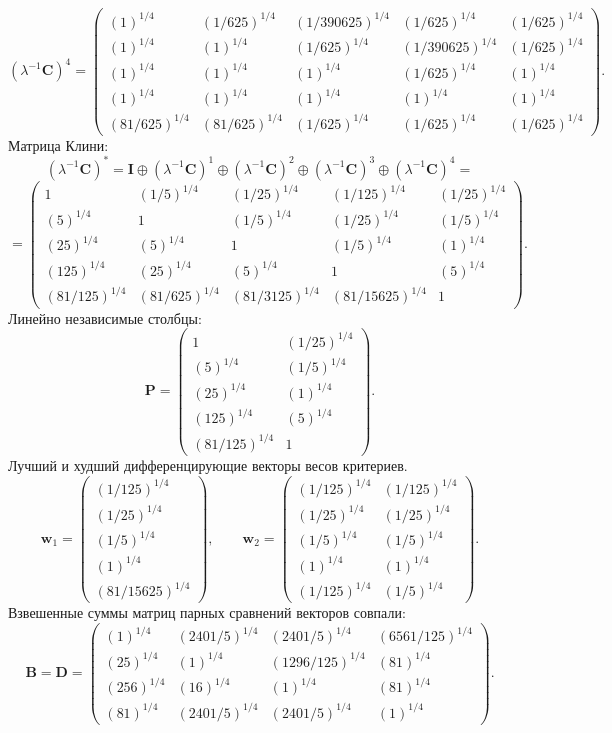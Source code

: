 $$(\lambda^{-1}\bm{C})^4 = \begin{pmatrix}
(1)^{1/4} & (1/625)^{1/4} & (1/390625)^{1/4} & (1/625)^{1/4} & (1/625)^{1/4}\\
(1)^{1/4} & (1)^{1/4} & (1/625)^{1/4} & (1/390625)^{1/4} & (1/625)^{1/4}\\
(1)^{1/4} & (1)^{1/4} & (1)^{1/4} & (1/625)^{1/4} & (1)^{1/4}\\
(1)^{1/4} & (1)^{1/4} & (1)^{1/4} & (1)^{1/4} & (1)^{1/4}\\
(81/625)^{1/4} & (81/625)^{1/4} & (1/625)^{1/4} & (1/625)^{1/4} & (1/625)^{1/4}
\end{pmatrix}.
$$
Матрица Клини:
$$(\lambda^{-1}\bm{C})^* = \bm{I} \oplus (\lambda^{-1}\bm{C})^1 \oplus (\lambda^{-1}\bm{C})^2 \oplus (\lambda^{-1}\bm{C})^3 \oplus (\lambda^{-1}\bm{C})^4 = $$
$$ = \begin{pmatrix}
1 & (1/5)^{1/4} & (1/25)^{1/4} & (1/125)^{1/4} & (1/25)^{1/4}\\
(5)^{1/4} & 1 & (1/5)^{1/4} & (1/25)^{1/4} & (1/5)^{1/4}\\
(25)^{1/4} & (5)^{1/4} & 1 & (1/5)^{1/4} & (1)^{1/4}\\
(125)^{1/4} & (25)^{1/4} & (5)^{1/4} & 1 & (5)^{1/4}\\
(81/125)^{1/4} & (81/625)^{1/4} & (81/3125)^{1/4} & (81/15625)^{1/4} & 1
\end{pmatrix}.
$$
Линейно независимые столбцы:
$$\bm{P} = \begin{pmatrix}
1 & (1/25)^{1/4}\\
(5)^{1/4} & (1/5)^{1/4}\\
(25)^{1/4} & (1)^{1/4}\\
(125)^{1/4} & (5)^{1/4}\\
(81/125)^{1/4} & 1
\end{pmatrix}.
$$
Лучший и худший дифференцирующие векторы весов критериев.
$$\bm{w}_1 = \begin{pmatrix}
(1/125)^{1/4}\\
(1/25)^{1/4}\\
(1/5)^{1/4}\\
(1)^{1/4}\\
(81/15625)^{1/4}
\end{pmatrix},
\qquad \bm{w}_2 = \begin{pmatrix}
(1/125)^{1/4} & (1/125)^{1/4}\\
(1/25)^{1/4} & (1/25)^{1/4}\\
(1/5)^{1/4} & (1/5)^{1/4}\\
(1)^{1/4} & (1)^{1/4}\\
(1/125)^{1/4} & (1/5)^{1/4}
\end{pmatrix}.
$$
Взвешенные суммы матриц парных сравнений векторов совпали:
$$\bm{B} = \bm{D} =\begin{pmatrix}
(1)^{1/4} & (2401/5)^{1/4} & (2401/5)^{1/4} & (6561/125)^{1/4}\\
(25)^{1/4} & (1)^{1/4} & (1296/125)^{1/4} & (81)^{1/4}\\
(256)^{1/4} & (16)^{1/4} & (1)^{1/4} & (81)^{1/4}\\
(81)^{1/4} & (2401/5)^{1/4} & (2401/5)^{1/4} & (1)^{1/4}
\end{pmatrix}.
$$

